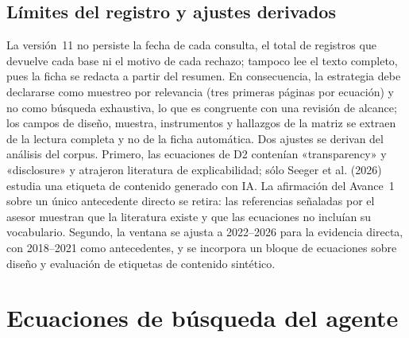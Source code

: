 \subsection{Límites del registro y ajustes derivados}

La versión~11 no persiste la fecha de cada consulta, el total de registros
que devuelve cada base ni el motivo de cada rechazo; tampoco lee el texto
completo, pues la ficha se redacta a partir del resumen. En consecuencia, la
estrategia debe declararse como muestreo por relevancia (tres primeras
páginas por ecuación) y no como búsqueda exhaustiva, lo que es congruente con
una revisión de alcance; los campos de diseño, muestra, instrumentos y
hallazgos de la matriz se extraen de la lectura completa y no de la ficha
automática. Dos ajustes se derivan del análisis del corpus. Primero, las
ecuaciones de D2 contenían «transparency» y «disclosure» y atrajeron
literatura de explicabilidad; sólo Seeger et al. (2026) estudia una etiqueta
de contenido generado con IA. La afirmación del Avance~1 sobre un único
antecedente directo se retira: las referencias señaladas por el asesor
muestran que la literatura existe y que las ecuaciones no incluían su
vocabulario. Segundo, la ventana se ajusta a 2022--2026 para la evidencia
directa, con 2018--2021 como antecedentes, y se incorpora un bloque de
ecuaciones sobre diseño y evaluación de etiquetas de contenido sintético.

\appendix
\section{Ecuaciones de búsqueda del agente}
\label{anx:ecuaciones}


